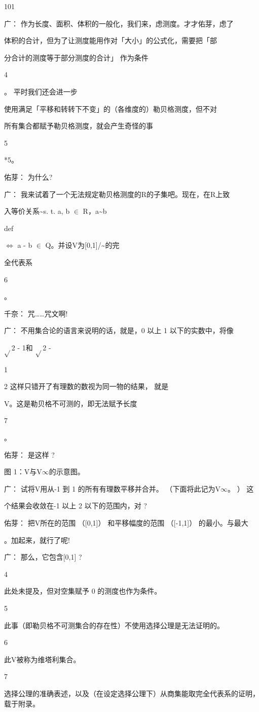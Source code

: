 101\par
广： 作为长度、面积、体积的一般化，我们来，虑测度。才才佑芽，虑了\par
体积的合计，但为了让测度能用作对「大小」的公式化，需要把「部\par
分合计的测度等于部分测度的合计」 作为条件\par
4\par
。 平时我们还会进一步\par
使用满足「平移和转转下不变」的（各维度的）勒贝格测度，但不对\par
所有集合都赋予勒贝格测度，就会产生奇怪的事\par
5\par
*5。\par
佑芽： 为什么?\par
广： 我来试着了一个无法规定勒贝格测度的R的子集吧。现在，在R上致\par
入等价关系\textasciitilde{}s. t.  a, b $\in$ R，a\textasciitilde{}b\par
def\par
$\Leftrightarrow$ a - b $\in$ Q。并设V为[0,1]/\textasciitilde{}的完\par
全代表系\par
6\par
。\par
千奈： 咒……咒文啊!\par
广： 不用集合论的语言来说明的话，就是，0 以上 1 以下的实数中，将像\par
$\sqrt{}$2 - 1和 $\sqrt{}$2 -\par
1\par
2 这样只错开了有理数的数视为同一物的结果， 就是\par
V。这是勒贝格不可测的，即无法赋予长度\par
7\par
。\par
佑芽： 是这样 ?\par
图 1：V与V$\infty$的示意图。\par
广： 试将V用从-1 到 1 的所有有理数平移并合并。 （下面将此记为V$\infty$。 ） 这\par
个结果会收敛在-1 以上 2 以下的范围内，对 ?\par
佑芽： 把V所在的范围 （[0,1]） 和平移幅度的范围 （[-1,1]） 的最小。与最大\par
。加起来，就行了呢!\par
广： 那么，它包含[0,1] ?\par
4\par
此处未提及，但对空集赋予 0 的测度也作为条件。\par
5\par
此事（即勒贝格不可测集合的存在性）不使用选择公理是无法证明的。\par
6\par
此V被称为维塔利集合。\par
7\par
选择公理的准确表述，以及（在设定选择公理下）从商集能取完全代表系的证明，载于附录。\par

